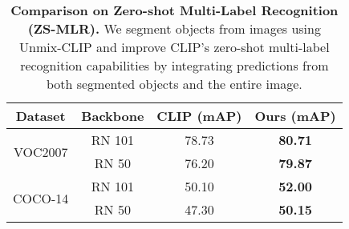 \begin{table}[tp]
\centering
\caption{ \textbf{Comparison on Zero-shot Multi-Label Recognition (ZS-MLR).}  We segment objects from images using Unmix-CLIP and improve CLIP's zero-shot multi-label recognition capabilities by integrating predictions from both segmented objects and the entire image.}
\small
\begin{tabular}{cccc}
\toprule
\textbf{Dataset} & \textbf{Backbone} & \textbf{CLIP (mAP)} & \textbf{Ours (mAP)} \\ \midrule
\multirow{2}{*}{VOC2007}  & RN 101            & 78.73         & \textbf{80.71}         \\ 
                         & RN 50             & 76.20         & \textbf{79.87}         \\ \midrule
\multirow{2}{*}{COCO-14} & RN 101            & 50.10         & \textbf{52.00}         \\ 
                         & RN 50             & 47.30         & \textbf{50.15}            \\ \bottomrule
\end{tabular}
\label{tab:zero_shot_mlr}
\end{table}
